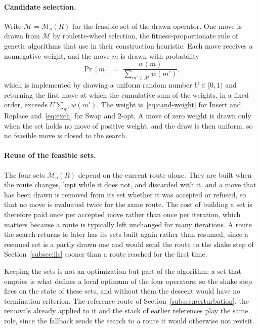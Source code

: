 \paragraph{Candidate selection.}
Write $\mathcal{M} = \mathcal{M}_o(R)$ for the feasible set of the drawn operator. One move is drawn from $\mathcal{M}$ by roulette-wheel selection, the fitness-proportionate rule of genetic algorithms \citep{goldberg1989genetic} that \citep{gunawan2015iterated} use in their construction heuristic. Each move receives a nonnegative weight, and the move $m$ is drawn with probability
\begin{equation}\label{eq:roulette}
    \Pr[m] \;=\; \frac{w(m)}{\sum_{m' \in \mathcal{M}} w(m')},
\end{equation}
which is implemented by drawing a uniform random number $U \in [0, 1)$ and returning the first move at which the cumulative sum of the weights, in a fixed order, exceeds $U \sum_{m'} w(m')$. The weight is~\eqref{eq:cand-weight} for Insert and Replace and~\eqref{eq:exch} for Swap and 2-opt. A move of zero weight is drawn only when the set holds no move of positive weight, and the draw is then uniform, so no feasible move is closed to the search.

\paragraph{Reuse of the feasible sets.}
The four sets $\mathcal{M}_o(R)$ depend on the current route alone. They are built when the route changes, kept while it does not, and discarded with it, and a move that has been drawn is removed from its set whether it was accepted or refused, so that no move is evaluated twice for the same route. The cost of building a set is therefore paid once per accepted move rather than once per iteration, which matters because a route is typically left unchanged for many iterations. A route the search returns to later has its sets built again rather than resumed, since a resumed set is a partly drawn one and would send the route to the shake step of Section~\ref{subsec:ils} sooner than a route reached for the first time.

Keeping the sets is not an optimization but part of the algorithm: a set that empties is what defines a local optimum of the four operators, so the shake step fires on the state of these sets, and without them the descent would have no termination criterion. The reference route of Section~\ref{subsec:perturbation}, the removals already applied to it and the stack of earlier references play the same role, since the fallback sends the search to a route it would otherwise not revisit.

